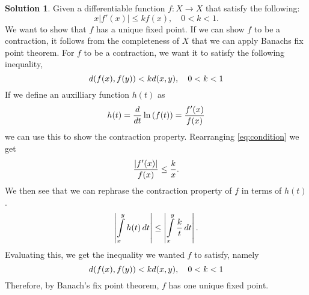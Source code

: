 \documentclass[a4paper]{article}
\theoremstyle{definition}
\newtheorem{sol}{Solution}
\begin{document}
\begin{sol}
Given a differentiable function $f: X \longrightarrow X$ that satisfy the
following:
\begin{equation}
  \label{eq:condition}
  x\left|f'(x)\right| \leq kf(x), \quad 0 < k < 1.
\end{equation}
We want to show that $f$ has a unique fixed point.  If we can show $f$ to be a
contraction, it follows from the completeness of $X$ that we can apply Banachs
fix point theorem.  For $f$ to be a contraction, we want it to satisfy the
following inequality,
\begin{equation}
  \notag
  d(f(x), f(y)) < kd(x, y), \quad 0 < k < 1
\end{equation}
If we define an auxilliary function $h(t)$ as
\begin{equation}
  \notag
  h(t) = \frac{d}{dt} \ln\left(f(t)\right)  = \frac{f'(x)}{f(x)}
\end{equation} 
we can use this to show the contraction property.  Rearranging
\eqref{eq:condition} we get
\begin{equation}
  \notag
  \frac{\left| f'(x)\right|}{f(x)} \leq \frac{k}{x}.
\end{equation}
We then see that we can rephrase the contraction property of $f$ in terms of $h(t)$.
\begin{equation}
  \notag
  \left| \int\limits_{x}^{y} h(t) \, dt  \right|  \leq \left| \int\limits_{x}^{y} \frac{k}{t} \, dt \right|.
\end{equation}
Evaluating this, we get the inequality we wanted $f$ to satisfy, namely
\begin{equation}
  \notag
  d(f(x), f(y)) < kd(x, y), \quad 0 < k < 1
  \end{equation}
  Therefore, by Banach's fix point theorem, $f$ has one unique fixed point.
\end{sol}
\end{document}
